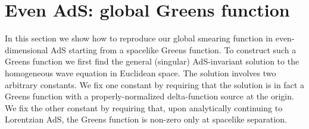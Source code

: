 \documentclass[12pt]{article}
\begin{document}
\section{Even AdS: global Greens function} \label{eggads}

In this section we show how to reproduce our global smearing function
in even-dimensional AdS starting from a spacelike Greens function.  To
construct such a Greens function we first find the general (singular)
AdS-invariant solution to the homogeneous wave equation in Euclidean
space.  The solution involves two arbitrary constants.  We fix one
constant by requiring that the solution is in fact a Greens function
with a properly-normalized delta-function source at the origin.  We
fix the other constant by requiring that, upon analytically continuing
to Lorentzian AdS, the Greens function is non-zero only at spacelike
separation.
\end{document}
